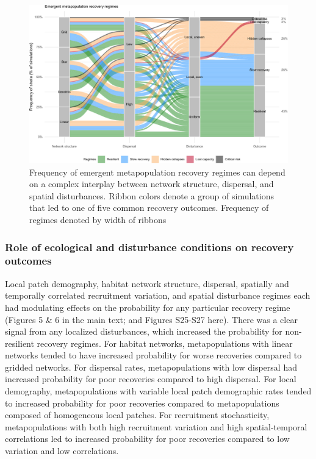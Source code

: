\documentclass[
]{article}
\begin{document}
\begin{figure}[H]

{\centering \includegraphics{Managing_for_ecological_surprises_in_metapopulations_files/figure-latex/cluster results-1} 

}

\caption{Frequency of emergent metapopulation recovery regimes can depend on a complex interplay between network structure, dispersal, and spatial disturbances. Ribbon colors denote a group of simulations that led to one of five common recovery outcomes. Frequency of regimes denoted by width of ribbons}\label{fig:cluster results}
\end{figure}

\hypertarget{role-of-ecological-and-disturbance-conditions-on-recovery-outcomes}{%
\subsubsection{Role of ecological and disturbance conditions on recovery
outcomes}\label{role-of-ecological-and-disturbance-conditions-on-recovery-outcomes}}

Local patch demography, habitat network structure, dispersal, spatially
and temporally correlated recruitment variation, and spatial disturbance
regimes each had modulating effects on the probability for any
particular recovery regime (Figures 5 \& 6 in the main text; and Figures
S25-S27 here). There was a clear signal from any localized disturbances,
which increased the probability for non-resilient recovery regimes. For
habitat networks, metapopulations with linear networks tended to have
increased probability for worse recoveries compared to gridded networks.
For dispersal rates, metapopulations with low dispersal had increased
probability for poor recoveries compared to high dispersal. For local
demography, metapopulations with variable local patch demographic rates
tended to increased probability for poor recoveries compared to
metapopulations composed of homogeneous local patches. For recruitment
stochasticity, metapopulations with both high recruitment variation and
high spatial-temporal correlations led to increased probability for poor
recoveries compared to low variation and low correlations.
\end{document}

